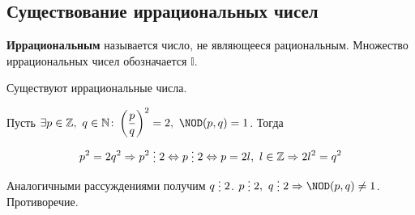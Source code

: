 \subsection{Существование иррациональных чисел}
  \textbf{Иррациональным} называется число, не являющееся рациональным.
Множество иррациональных чисел обозначается $\mathbb I$.

\begin{statement}
Существуют иррациональные числа.
\end{statement}
\begin{proofcontra}
Пусть $\exists p \in \mathbb Z, \ q \in \mathbb N \colon
\left( \dfrac{p}q \right)^2 = 2, \ \NOD(p, q) = 1$.
Тогда
\begin{equation*}
p^2 = 2q^2 \Rightarrow p^2 \mult 2 \Leftrightarrow p \mult 2
\Leftrightarrow p = 2l, \ l \in \mathbb Z \Rightarrow 2l^2 = q^2
\end{equation*}

Аналогичными рассуждениями получим $q \mult 2$.
$p \mult 2, \ q \mult 2 \Rightarrow \NOD(p, q) \neq 1$.
Противоречие.
\end{proofcontra}

